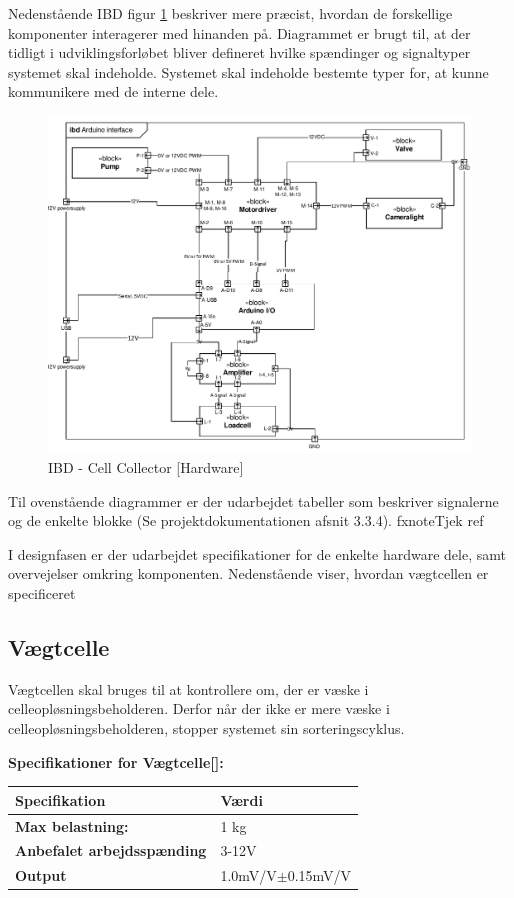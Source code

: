Nedenstående IBD figur \ref{fig:ibd_Hardware} beskriver mere præcist, hvordan de forskellige komponenter interagerer med hinanden på. Diagrammet er brugt til, at der tidligt i udviklingsforløbet bliver defineret hvilke spændinger og signaltyper systemet skal indeholde. Systemet skal indeholde bestemte typer for, at kunne kommunikere med de interne dele.


\begin{figure}[H]
	\centering
	\includegraphics[width=1\textwidth]{pdf/IBD_Hardware(Arduino).pdf}
	\caption{IBD - Cell Collector [Hardware]}
	\label{fig:ibd_Hardware}
\end{figure}

Til ovenstående diagrammer er der udarbejdet tabeller som beskriver signalerne og de enkelte blokke (Se projektdokumentationen afsnit 3.3.4). fxnote{Tjek ref}

I designfasen er der udarbejdet specifikationer for de enkelte hardware dele, samt overvejelser omkring komponenten. Nedenstående viser, hvordan vægtcellen er specificeret
\subsection{Vægtcelle}
\label{subsec:loadcell}
Vægtcellen skal bruges til at kontrollere om, der er væske i celleopløsningsbeholderen. Derfor når der ikke er mere væske i celleopløsningsbeholderen, stopper systemet sin sorteringscyklus.

\textbf{Specifikationer for Vægtcelle[\citet{DH7}]:} 
\begin{center}
		\begin{longtable}{ | m{6.5cm} | m{6.5cm}| } 
			\hline
			\textbf{Specifikation} &\textbf{Værdi} \\ 
			\hline
			\textbf{Max belastning:} & 1 kg \\ 
			\hline
			\textbf{Anbefalet arbejdsspænding} & 3-12V \\ 
			\hline
			\textbf{Output} & 1.0mV/V$\pm$0.15mV/V \\ 
			\hline
		\end{longtable}
\end{center}


